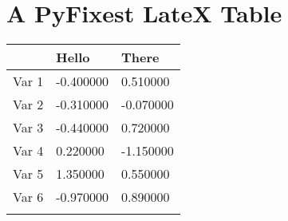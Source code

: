 \documentclass{article}%
\begin{document}
%
\normalsize%
\section{A PyFixest LateX Table}%
\label{sec:APyFixestLateXTable}%


\begin{table}[htbp]%
\renewcommand\cellalign{t}
\begin{threeparttable}
\begin{tabularx}{\linewidth}{p{3cm}XX}
\toprule
 & Hello & There \\
\midrule
\addlinespace
Var 1 & -0.400000 & 0.510000 \\
Var 2 & -0.310000 & -0.070000 \\
Var 3 & -0.440000 & 0.720000 \\
Var 4 & 0.220000 & -1.150000 \\
Var 5 & 1.350000 & 0.550000 \\
Var 6 & -0.970000 & 0.890000 \\
\addlinespace
\bottomrule
\end{tabularx}
 \vspace{3pt}
\footnotesize 
\end{threeparttable}%
\end{table}

%
\end{document}
